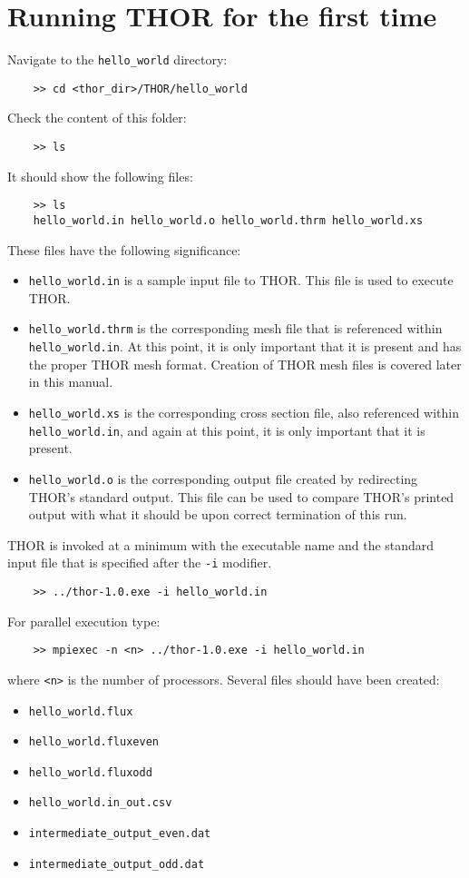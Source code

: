 \section{Running THOR for the first time}
Navigate to the \verb"hello_world" directory:
\begin{verbatim}
    >> cd <thor_dir>/THOR/hello_world
\end{verbatim}
Check the content of this folder:
\begin{verbatim}
    >> ls
\end{verbatim}
It should show the following files:
\begin{verbatim}
    >> ls
    hello_world.in hello_world.o hello_world.thrm hello_world.xs
\end{verbatim}
These files have the following significance:
\begin{itemize}
    \item \verb"hello_world.in" is a sample input file to THOR. This file is used to execute THOR.
    \item \verb"hello_world.thrm" is the corresponding mesh file that is referenced within \verb"hello_world.in". At this point, it is only important that it is present and has the proper THOR mesh format. Creation of THOR mesh files is covered later in this manual.
    \item \verb"hello_world.xs" is the corresponding cross section file, also referenced within \verb"hello_world.in", and again at this point, it is only important that it is present.
    \item \verb"hello_world.o" is the corresponding output file created by redirecting THOR's standard output. This file can be used to compare THOR's printed output with what it should be upon correct termination of this run.
\end{itemize}
THOR is invoked at a minimum with the executable name and the standard input file that is specified after the \verb"-i" modifier.
\begin{verbatim}
    >> ../thor-1.0.exe -i hello_world.in
\end{verbatim}
For parallel execution type:
\begin{verbatim}
    >> mpiexec -n <n> ../thor-1.0.exe -i hello_world.in
\end{verbatim}
where \verb"<n>" is the number of processors.
Several files should have been created:
\begin{itemize}
    \item \verb"hello_world.flux"
    \item \verb"hello_world.fluxeven"
    \item \verb"hello_world.fluxodd"
    \item \verb"hello_world.in_out.csv"
    \item \verb"intermediate_output_even.dat" \item \verb"intermediate_output_odd.dat"
\end{itemize}

